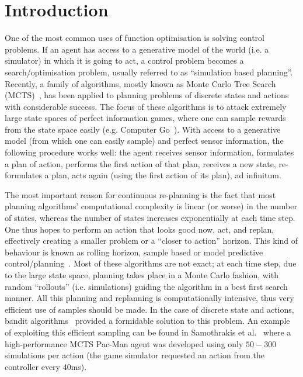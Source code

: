 \documentclass[conference]{IEEEtran}
\begin{document}
\section{Introduction} \label{Introduction}
One of the most common uses of function optimisation is solving control problems. If an agent has access to a generative model of the world (i.e. a simulator) in which it is going to act, a control problem becomes a search/optimisation problem, usually referred to as ``simulation based planning''. Recently, a family of algorithms, mostly known as Monte Carlo Tree Search (MCTS)~\cite{browne2012survey}, has been applied to planning problems of discrete states and actions with considerable success. The focus of these algorithms is to attack extremely large state spaces of perfect information games, where one can sample rewards from the state space easily (e.g. Computer Go~\cite{gelly2006modification}). With access to a generative model (from which one can easily sample) and perfect sensor information, the following procedure works well: the agent receives sensor information, formulates a plan of action, performs the first action of that plan, receives a new state, re-formulates a plan, acts again (using the first action of its plan),  ad infinitum.

The most important reason for continuous re-planning is the fact that most planning algorithms' computational complexity is linear (or worse) in the number of states, whereas the number of states increases exponentially at each time step. One thus hopes to perform an action that looks good now, act, and replan, effectively creating a smaller problem or a ``closer to action'' horizon. This kind of behaviour is known as rolling horizon, sample based or model predictive control/planning~\cite{chang2007simulation}. Most of these algorithms are not exact; at each time step, due to the large state space, planning takes place in a Monte Carlo fashion, with random ``rollouts'' (i.e. simulations) guiding the algorithm in a best first search manner. All this planning and replanning is computationally intensive, thus very efficient use of samples should be made.  In the case of discrete state and actions, bandit algorithms~\cite{auer2002finite} provided a formidable solution to this problem.
An example of exploiting this efficient sampling can be found in Samothrakis et al.~\cite{samothrakis2011fast} where a high-performance MCTS Pac-Man agent
was developed using only $50 - 300$ simulations per action (the game simulator requested an action
from the controller every 40ms).
\end{document}
